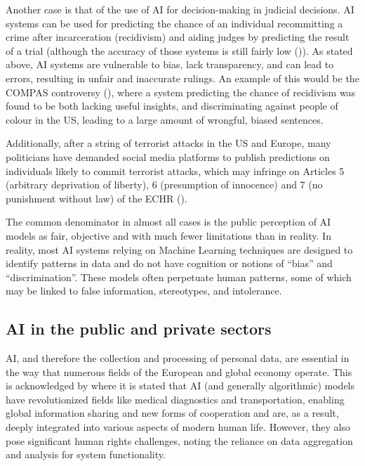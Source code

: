 \documentclass{article}
\begin{document}
Another case is that of the use of AI for decision-making in judicial decisions. AI systems can be used for predicting the chance of an individual recommitting a crime after incarceration (recidivism) and aiding judges by predicting the result of a trial (although the accuracy of those systems is still fairly low (\cite{wagner2018})). As stated above, AI systems are vulnerable to bias, lack transparency, and can lead to errors, resulting in unfair and inaccurate rulings. An example of this would be the COMPAS controversy (\cite{compas_analysis}), where a system predicting the chance of recidivism was found to be both lacking useful insights, and discriminating against people of colour in the US, leading to a large amount of wrongful, biased sentences.

Additionally, after a string of terrorist attacks in the US and Europe, many politicians have demanded social media platforms to publish predictions on individuals likely to commit terrorist attacks, which may infringe on Articles 5 (arbitrary deprivation of liberty), 6 (presumption of innocence) and 7 (no punishment without law) of the ECHR (\cite{wagner2018}).

The common denominator in almost all cases is the public perception of AI models as fair, objective and with much fewer limitations than in reality. In reality, most AI systems relying on Machine Learning techniques are designed to identify patterns in data and do not have cognition or notions of “bias” and “discrimination”. These models often perpetuate human patterns, some of which may be linked to false information, stereotypes, and intolerance.



\subsection{AI in the public and private sectors}
\label{ssec:public_private}

AI, and therefore the collection and processing of personal data, are essential in the way that numerous fields of the European and global economy operate. This is acknowledged by \cite{cmrec2020} where it is stated that AI (and generally algorithmic) models have revolutionized fields like medical diagnostics and transportation, enabling global information sharing and new forms of cooperation and are, as a result, deeply integrated into various aspects of modern human life. However, they also pose significant human rights challenges, noting the reliance on data aggregation and analysis for system functionality. 
\end{document}
